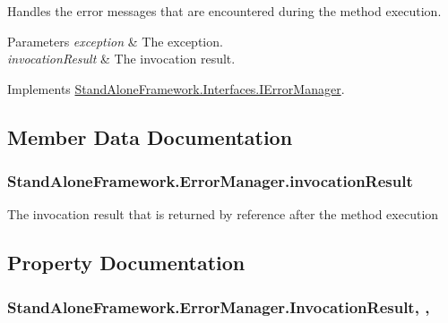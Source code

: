 Handles the error messages that are encountered during the method execution. 


\begin{DoxyParams}{Parameters}
{\em exception} & The exception.\\
\hline
{\em invocation\+Result} & The invocation result.\\
\hline
\end{DoxyParams}


Implements \hyperlink{interface_stand_alone_framework_1_1_interfaces_1_1_i_error_manager_a54b9927bcf2778d3626a60f7439e41eb}{Stand\+Alone\+Framework.\+Interfaces.\+I\+Error\+Manager}.



\subsection{Member Data Documentation}
\hypertarget{class_stand_alone_framework_1_1_error_manager_a25023f8540577f3d5d901f2569c3f2ec}{
\subsubsection[{invocation\+Result}]{ Stand\+Alone\+Framework.\+Error\+Manager.\+invocation\+Result\hspace{0.3cm}{\ttfamily [protected]}}}\label{class_stand_alone_framework_1_1_error_manager_a25023f8540577f3d5d901f2569c3f2ec}


The invocation result that is returned by reference after the method execution 



\subsection{Property Documentation}
\hypertarget{class_stand_alone_framework_1_1_error_manager_a98353b3c901cdfb95f1c8dc3499ebb13}{
\subsubsection[{Invocation\+Result}]{ Stand\+Alone\+Framework.\+Error\+Manager.\+Invocation\+Result\hspace{0.3cm}{\ttfamily [get]}, {\ttfamily [set]}, {\ttfamily [protected]}}}\label{class_stand_alone_framework_1_1_error_manager_a98353b3c901cdfb95f1c8dc3499ebb13}


